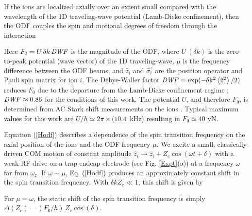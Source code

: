 \documentclass[aps,prl,twocolumn,superscriptaddress,floatfix]{revtex4-1}
\begin{document}
If the ions are localized axially over an extent small compared with the wavelength of the 1D traveling-wave potential (Lamb-Dicke confinement), then the ODF couples the spin and motional degrees of freedom through the interaction \citep{Bohnet2015}

Here $F_{0}= U \, \delta k \, \rm{\it{DWF}}$ is the magnitude of the ODF, where $U\:(\delta k)$ is the zero-to-peak potential (wave vector) of the 1D traveling-wave, $\mu$ is the frequency difference between the ODF beams, and $\hat{z}_{i}$ and $\hat{\sigma}^{z}_{i}$ are the position operator and Pauli spin matrix for ion $i$. The Debye-Waller factor $\rm{\it{DWF}} = \exp(-\delta k^2 \left< \hat{z}^{2}_{i} \right> / 2)$ reduces $F_{0}$ due to the departure from the Lamb-Dicke confinement regime \citep{Wineland1998a}; $\rm{\it{DWF}} \approx 0.86 $ for the conditions of this work. The potential $U$, and therefore $F_0$, is determined from AC Stark shift measurements on the ions \citep{Britton2012}. Typical maximum values for this work are $U/\hbar \simeq 2 \pi \times (10.4$~kHz) resulting in $F_0 \simeq 40$ yN.

Equation (\ref{Hodf}) describes a dependence of the spin transition frequency on the axial position of the ions and the ODF frequency $\mu$. We excite a small, classically driven COM motion of constant amplitude $\hat{z}_i \rightarrow \hat{z}_i +Z_c\cos(\omega t+\delta)$ with a weak RF drive on a trap endcap electrode (see Fig. \ref{Expt}(a)) at a frequency $\omega$ far from $\omega_{z}$. If $\omega\sim\mu$, Eq. (\ref{Hodf}) produces an approximately constant shift in the spin transition frequency. With $\delta k Z_c \ll 1$, this shift is given by

For $\mu = \omega$, the static shift of the spin transition frequency is simply $\Delta(Z_c) = (F_{0}/\hbar) \, Z_c \cos(\delta)$.
\end{document}
